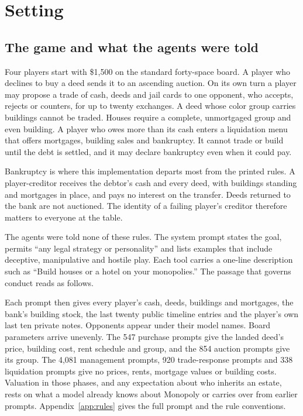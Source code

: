 \section{Setting}
\label{sec:setting}

\subsection{The game and what the agents were told}

Four players start with \$1,500 on the standard forty-space board. A player who declines to buy a deed sends it to an ascending auction. On its own turn a player may propose a trade of cash, deeds and jail cards to one opponent, who accepts, rejects or counters, for up to twenty exchanges. A deed whose color group carries buildings cannot be traded. Houses require a complete, unmortgaged group and even building. A player who owes more than its cash enters a liquidation menu that offers mortgages, building sales and bankruptcy. It cannot trade or build until the debt is settled, and it may declare bankruptcy even when it could pay.

Bankruptcy is where this implementation departs most from the printed rules. A player-creditor receives the debtor's cash and every deed, with buildings standing and mortgages in place, and pays no interest on the transfer. Deeds returned to the bank are not auctioned. The identity of a failing player's creditor therefore matters to everyone at the table.

The agents were told none of these rules. The system prompt states the goal, permits ``any legal strategy or personality'' and lists examples that include deceptive, manipulative and hostile play. Each tool carries a one-line description such as ``Build houses or a hotel on your monopolies.'' The passage that governs conduct reads as follows.
\begin{promptbox}

\end{promptbox}
Each prompt then gives every player's cash, deeds, buildings and mortgages, the bank's building stock, the last twenty public timeline entries and the player's own last ten private notes. Opponents appear under their model names. Board parameters arrive unevenly. The 547 purchase prompts give the landed deed's price, building cost, rent schedule and group, and the 854 auction prompts give its group. The 4,081 management prompts, 920 trade-response prompts and 338 liquidation prompts give no prices, rents, mortgage values or building costs. Valuation in those phases, and any expectation about who inherits an estate, rests on what a model already knows about Monopoly or carries over from earlier prompts. Appendix~\ref{app:rules} gives the full prompt and the rule conventions.

